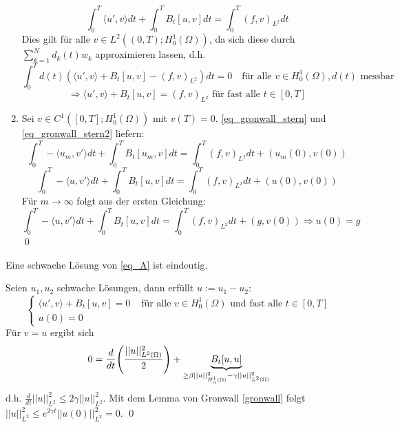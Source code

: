 \begin{enumerate}[1)]
\begin{equation}
			\int_{0}^{T} \langle u',v \rangle dt + \int_{0}^{T} B_t [u,v] dt = \int_{0}^{T} (f,v)_{L^2} dt \label{eq_gronwall_stern2}
		\end{equation}
		Dies gilt für alle $v \in L^2((0,T);H_0^1(\Omega))$, da sich diese durch $\sum_{k=1}^{N} d_k(t) w_k$ approximieren lassen, d.h.
		\[ \int_{0}^{T} d(t) (\langle u',v \rangle + B_t[u,v] - (f,v)_{L^2})dt = 0 \quad \text{für alle } v \in H_0^1(\Omega), d(t) \text{ messbar} \]
		\[ \Rightarrow \langle u',v \rangle + B_t[u,v] = (f,v)_{L^2} \text{ für fast alle } t \in [0,T] \]
		\item Sei $v \in C^1([0,T];H_0^1(\Omega))$ mit $v(T) = 0$. \eqref{eq_gronwall_stern} und \eqref{eq_gronwall_stern2} liefern:
		\[ \int_{0}^{T} -\langle u_m, v' \rangle dt + \int_{0}^{T} B_t [u_m,v] dt = \int_{0}^{T} (f,v)_{L^2} dt + (u_m(0),v(0)) \]
		\[ \int_{0}^{T} -\langle u, v' \rangle dt + \int_{0}^{T} B_t [u,v] dt = \int_{0}^{T} (f,v)_{L^2} dt + (u(0),v(0)) \]
		Für $m \rightarrow \infty$ folgt aus der ersten Gleichung:
		\[ \int_{0}^{T} -\langle u, v' \rangle dt + \int_{0}^{T} B_t [u,v] dt = \int_{0}^{T} (f,v)_{L^2} dt + (g,v(0)) \Rightarrow u(0) = g\] \qed
	\end{enumerate}

\begin{thm}
	Eine schwache Lösung von \eqref{eq_A} ist eindeutig.
\end{thm}
	
	Seien $u_1, u_2$ schwache Lösungen, dann erfüllt $u := u_1 - u_2$:
	\[ \begin{cases}
		\langle u',v \rangle + B_t[u,v] = 0 & \text{ für alle } v \in H_0^1(\Omega) \text{ und fast alle } t \in [0,T] \\
		u(0)=0 \end{cases} \]
	Für $v = u$ ergibt sich
	\[ 0 = \frac{d}{dt} \enbrace*{\frac{||u||_{L^2(\Omega)}^2}{2}} + \underbrace{B_t[u,u]}_{\geq \beta ||u||_{H_0^1(\Omega)}^2 - \gamma ||u||_{L^2(\Omega)}^2} \]
	d.h. $\frac{d}{dt} ||u||_{L^2}^2 \leq 2\gamma ||u||_{L^2}^2$. Mit dem Lemma von Gronwall \ref{gronwall} folgt $||u||_{L^2}^2 \leq e^{2 \gamma t} ||u(0)||_{L^2}^2 = 0$. \qed
\newpage